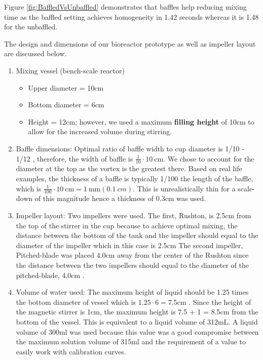 Figure \ref{fig:BaffledVsUnbaffled} demonstrates that baffles help reducing mixing time as the baffled setting achieves homogeneity in 1.42 seconds whereas it is 1.48 for the unbaffled.  

The design and dimensions of our bioreactor prototype as well as impeller layout are discussed below. 
\begin{enumerate}
	\item Mixing vessel (bench-scale reactor)
	\begin{itemize}
		\item Upper diameter = 10cm
		\item Bottom diameter = 6cm
		\item Height = 12cm; however, we used a maximum \textbf{filling height} of 10cm to allow for the increased volume during stirring.
	\end{itemize}
	\item Baffle dimensions:
	Optimal ratio of baffle width to cup diameter is 1/10 - 1/12 \cite[p.258]{Doran2012}, therefore, the width of baffle is $\frac{1}{10} \cdot \SI{10}{\centi\meter}$. We chose to account for the diameter at the top as the vortex is the greatest there. Based on real life examples, the thickness of a baffle is typically 1/100 the length of the baffle, which is $ \frac{1}{100} \cdot \SI{10}{\centi\meter} = \SI{1}{\milli\meter} (\SI{0.1}{cm})$. This is unrealistically thin for a scale-down of this magnitude hence a thickness of 0.3cm was used.
	\item Impeller layout:
	Two impellers were used. The first, Rushton, is 2.5cm from the top of the stirrer in the cup because to achieve optimal mixing, the distance between the bottom of the tank and the impeller should equal to the diameter of the impeller which in this case is 2.5cm \cite[p.286]{Doran2012} The second impeller, Pitched-blade was placed 4.0cm away from the center of the Rushton since the distance between the two impellers should equal to the diameter of the pitched-blade, 4.0cm \cite[p.286]{Doran2012}.
	\item Volume of water used:
	The maximum height of liquid should be 1.25 times the bottom diameter of vessel which is $1.25\cdot6 = 7.5\si{\centi\meter}$ \cite[p.257]{Doran2012}. Since the height of the magnetic stirrer is 1cm, the maximum height is 7.5 + 1 = 8.5cm from the bottom of the vessel. This is equivalent to a liquid volume of 312mL. A liquid volume of 300ml was used because this value was a good compromise between the maximum solution volume of 315ml and the requirement of a value to easily work with calibration curves. 
\end{enumerate}